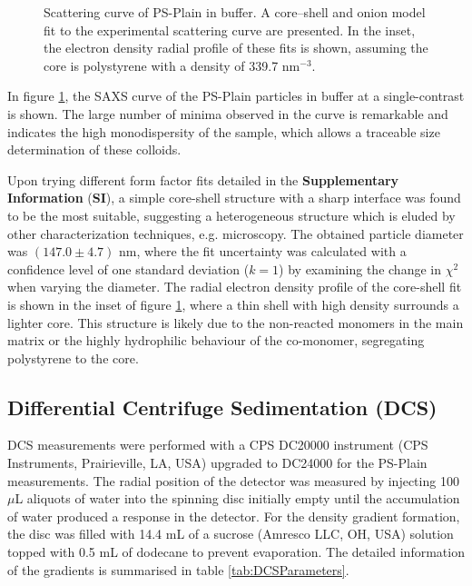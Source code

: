 \begin{figure}
	\begin{center}
		
	\end{center}
	\caption{Scattering curve of PS-Plain in buffer. A core–shell and onion model fit to the experimental scattering curve are presented. In the inset, the electron density radial profile
	\label{fig:PSPlainSingleContrastSAXS}
of these fits is shown, assuming the core is polystyrene with a density of 339.7 nm$^{-3}$.}
\end{figure}

In figure \ref{fig:PSPlainSingleContrastSAXS}, the SAXS curve of the  PS-Plain particles in buffer at a single-contrast is shown. The large number of minima observed in the curve is remarkable and indicates the high monodispersity of the sample, which allows a traceable size determination of these colloids.

Upon trying different form factor fits detailed in the \textbf{Supplementary Information} (\textbf{SI}), a simple core-shell structure with a sharp interface was found to be the most suitable, suggesting a heterogeneous structure which is eluded by other characterization techniques, e.g. microscopy. The obtained particle diameter was $(147.0\pm4.7)$ nm, where the fit uncertainty was calculated with a confidence level of one standard deviation ($k=1$) by examining the change in $\chi^2$ when varying the diameter. The radial electron density profile of the core-shell fit is shown in the inset of figure \ref{fig:PSPlainSingleContrastSAXS}, where a thin shell with high density surrounds a lighter core. This structure is likely due to the non-reacted monomers in the main matrix or the highly hydrophilic behaviour of the co-monomer, segregating polystyrene to the core.

\subsection{Differential Centrifuge Sedimentation (DCS)}
DCS measurements were performed with a CPS DC20000 instrument (CPS Instruments, Prairieville, LA, USA) upgraded to DC24000 for the PS-Plain measurements. The radial position of the detector was measured by injecting 100 $\mu$L aliquots of water into the spinning disc initially empty until the accumulation of water produced a response in the detector. For the density gradient formation, the disc was filled with 14.4 mL of a sucrose (Amresco LLC, OH, USA) solution topped with 0.5 mL of dodecane to prevent evaporation. The detailed information of the gradients is summarised in table \ref{tab:DCSParameters}.

